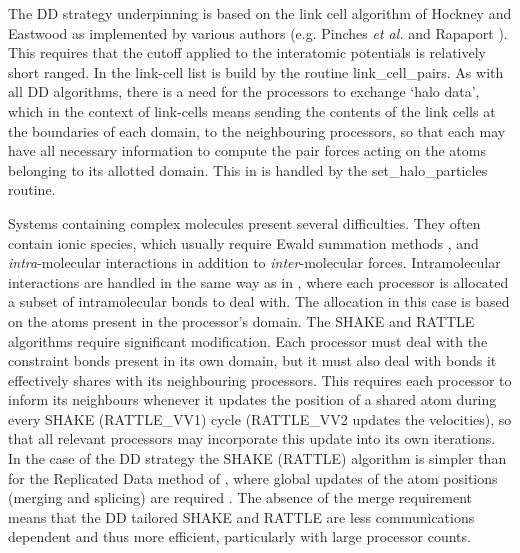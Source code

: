 The DD strategy underpinning \D is based on the link cell
algorithm of Hockney and Eastwood \cite{hockney-81a} as
implemented by various authors (e.g. Pinches {\em et al.}
\cite{pinches-91a} and Rapaport \cite{rapaport-91b}).  This
requires that the cutoff applied to the interatomic potentials is
relatively short ranged.  In \D the link-cell list is build by the
routine {\sc link\_cell\_pairs}.  As with all DD algorithms, there
is a need for the processors to exchange `halo data', which in the
context of link-cells means sending the contents of the link cells
at the boundaries of each domain, to the neighbouring processors,
so that each may have all necessary information to compute the
pair forces acting on the atoms belonging to its allotted domain.
This in \D is handled by the {\sc set\_halo\_particles} routine.

Systems containing complex molecules present several difficulties.
They often contain ionic species, which usually require Ewald
summation methods \cite{allen-89a,smith-92b},
and {\em intra}-molecular interactions in addition to
{\em inter}-molecular forces.  Intramolecular interactions are
handled in the same way as in \C, where each processor
is allocated a subset of intramolecular bonds to deal with.  The
allocation in this case is based on the atoms present in the
processor's domain.  The SHAKE and
RATTLE algorithms \cite{ryckaert-77a,andersen-83a}
require significant modification.  Each processor must deal with
the constraint bonds present in its own domain, but it must also
deal with bonds it effectively shares with its neighbouring
processors.  This requires each processor to inform its neighbours
whenever it updates the position of a shared atom during every
SHAKE (RATTLE\_VV1) cycle (RATTLE\_VV2 updates the velocities),
so that all relevant processors may incorporate this update into
its own iterations.  In the case of the DD strategy the SHAKE
(RATTLE) algorithm is simpler than for the Replicated Data method
of \C, where global updates of the atom positions
(merging and splicing) are required \cite{smith-93b}.  The
absence of the merge requirement means that the DD tailored
SHAKE and RATTLE are less communications dependent and thus more
efficient, particularly with large processor counts.

